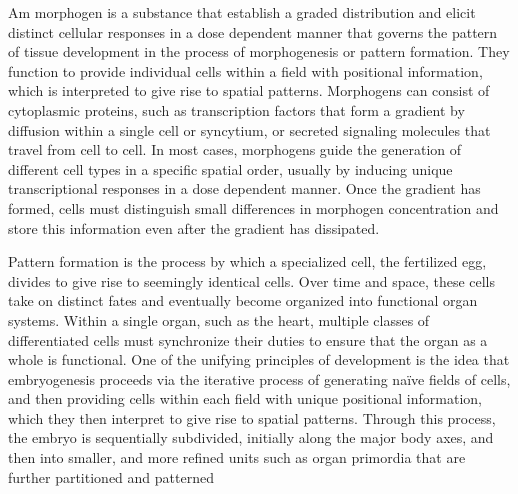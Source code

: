 \documentclass{article}
\begin{document}
Am morphogen is a substance that establish a graded distribution and elicit distinct cellular responses in a dose dependent manner that governs the pattern of tissue development in the process of morphogenesis or pattern formation. 
They function to provide individual cells within a field with positional information, which is interpreted to give rise to spatial patterns.
Morphogens can consist of cytoplasmic proteins, such as transcription factors that form a gradient by diffusion within a single cell or syncytium, or secreted signaling molecules that travel from cell to cell. 
In most cases, morphogens guide the generation of different cell types in a specific spatial order, usually by inducing unique transcriptional responses in a dose dependent manner.
Once the gradient has formed, cells must distinguish small differences in morphogen concentration and store this information even after the gradient has dissipated.

Pattern formation is the process by which a specialized cell, the fertilized egg, divides to give rise to seemingly identical cells. 
Over time and space, these cells take on distinct fates and eventually become organized into functional organ systems. 
Within a single organ, such as the heart, multiple classes of differentiated cells must synchronize their duties to ensure that the organ as a whole is functional. 
One of the unifying principles of development is the idea that embryogenesis proceeds via the iterative process of generating naïve fields of cells, and then providing cells within each field with unique positional information, which they then interpret to give rise to spatial patterns. 
Through this process, the embryo is sequentially subdivided, initially along the major body axes, and then into smaller, and more refined units such as organ primordia that are further partitioned and patterned	
\end{document}
